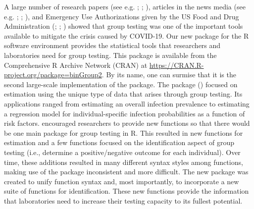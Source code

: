 A large number of research papers (see e.g. \citealt{abdalhamid2020assessment};
  \citealt{Hogan2020}; \citealt{barathidasan2022pooled}), articles
in the news media (see e.g. \citealt{ABCnews}; \citealt{NYTimesMandavilli};
\citealt{NYTimesAnthes}), and Emergency Use Authorizations given
by the US Food and Drug Administration (\citealt{LabCorp}; \citealt{Verily};
\citealt{Yale}) showed that group testing was one of the important
tools available to mitigate the crisis caused by COVID-19. Our new
 package for the R software environment  provides
the statistical tools that researchers and laboratories need for group
testing. This package is available from the Comprehensive R Archive
Network (CRAN) at \url{https://CRAN.R-project.org/package=binGroup2}.
By its name, one can surmise that it is the second large-scale implementation
of the package. The  package (\citealt{Bilder2010b})
focused on estimation using the unique type of data that arises through
group testing. Its applications ranged from estimating an overall
infection prevalence to estimating a regression model for individual-specific
infection probabilities as a function of risk factors. \citet{Bilder2010b}
encouraged researchers to provide new functions so that there would
be one main package for group testing in R. This resulted in new functions
for estimation and a few functions focused on the identification aspect
of group testing (i.e., determine a positive/negative outcome for
each individual). Over time, these additions resulted in many different
syntax styles among functions, making use of the package inconsistent
and more difficult. The new  package was created to
unify function syntax and, most importantly, to incorporate a new
suite of functions for identification. These new functions provide
the information that laboratories need to increase their testing capacity
to its fullest potential.

